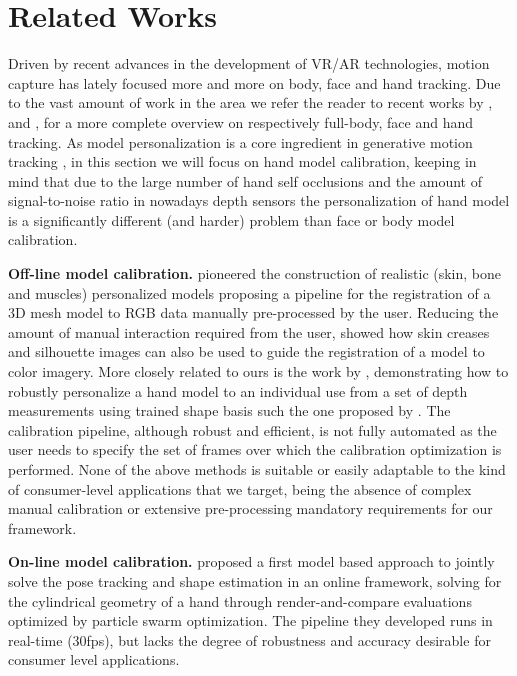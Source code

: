 \section{Related Works}
Driven by recent advances in the development of VR/AR technologies, motion capture has lately focused more and more on body, face and hand tracking. 
Due to the vast amount of work in the area we refer the reader to recent works by \cite{bogo2015detailed}, \cite{cao2016real} and \cite{taylor2016joint}, \cite{tkach2016sphere} for a more complete overview on respectively full-body, face and hand tracking.
As model personalization is a core ingredient in generative motion tracking \cite{pons2011model}, in this section we will focus on hand model calibration, keeping in mind that due to the large number of hand self occlusions and the amount of signal-to-noise ratio in nowadays depth sensors the personalization of hand model is a significantly different (and harder) problem than face or body model calibration.  

\textbf{Off-line model calibration.}
\cite{albrecht2003construction} pioneered the construction of realistic (skin, bone and muscles) personalized models proposing a pipeline for the registration of a 3D mesh model to RGB data manually pre-processed by the user. Reducing the amount of manual interaction required from the user, \cite{rhee2006human} showed how skin creases and silhouette images can also be used to guide the registration of a model to color imagery. More closely related to ours is the work by \cite{tan2016fits}, demonstrating how to robustly personalize a hand model to an individual use from a set of depth measurements using trained shape basis such the one proposed by \cite{taylor2014user}. The calibration pipeline, although robust and efficient, is not fully automated as the user needs to specify the set of frames over which the calibration optimization is performed. None of the above methods is suitable or easily adaptable to the kind of consumer-level applications that we target, being the absence of complex manual calibration or extensive pre-processing mandatory requirements for our framework.

\textbf{On-line model calibration.}
\cite{makris2015model} proposed a first model based approach to jointly solve the pose tracking and shape estimation in an online framework, solving for the cylindrical geometry of a hand through render-and-compare evaluations optimized by particle swarm optimization. The pipeline they developed runs in real-time (30fps), but lacks the degree of robustness and accuracy desirable for consumer level applications.








